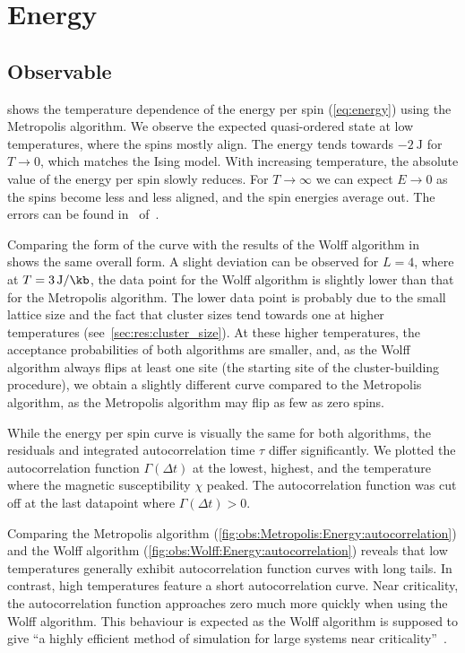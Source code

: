 \section{Energy}\label{sec:res:energy}
	\subsection{Observable}\label{sec:res:energy:observable}
		 shows the temperature dependence of the energy per spin (\cref{eq:energy}) using the Metropolis algorithm. We observe the expected quasi-ordered state at low temperatures, where the spins mostly align. The energy tends towards $\SI{-2}{\joule}$ for $T\rightarrow 0$, which matches the Ising model. With increasing temperature, the absolute value of the energy per spin slowly reduces. For $T \rightarrow \infty$ we can expect $E \rightarrow 0$ as the spins become less and less aligned, and the spin energies average out. The errors can be found in~ of~.
		
		Comparing the form of the curve with the results of the Wolff algorithm in~ shows the same overall form. A slight deviation can be observed for $L = 4$, where at $T = \SI{3}{\joule\per\kb}$, the data point for the Wolff algorithm is slightly lower than that for the Metropolis algorithm. The lower data point is probably due to the small lattice size and the fact that cluster sizes tend towards one at higher temperatures (see~\cref{sec:res:cluster_size}). At these higher temperatures, the acceptance probabilities of both algorithms are smaller, and, as the Wolff algorithm always flips at least one site (the starting site of the cluster-building procedure), we obtain a slightly different curve compared to the Metropolis algorithm, as the Metropolis algorithm may flip as few as zero spins.
		
		While the energy per spin curve is visually the same for both algorithms, the residuals and integrated autocorrelation time $\tau$ differ significantly. We plotted the autocorrelation function $\Gamma(\Delta t)$ at the lowest, highest, and the temperature where  the magnetic susceptibility $\chi$ peaked. The autocorrelation function was cut off at the last datapoint where $\Gamma(\Delta t) > \num{0}$.
		
		Comparing the Metropolis algorithm (\cref{fig:obs:Metropolis:Energy:autocorrelation}) and the Wolff algorithm (\cref{fig:obs:Wolff:Energy:autocorrelation}) reveals that low temperatures generally exhibit autocorrelation function curves with long tails. In contrast, high temperatures feature a short autocorrelation curve. Near criticality, the autocorrelation function approaches zero much more quickly when using the Wolff algorithm. This behaviour is expected as the Wolff algorithm is supposed to give \enquote{a highly efficient method of simulation for large systems near criticality}~\cite[p. 86]{sw}.
		
